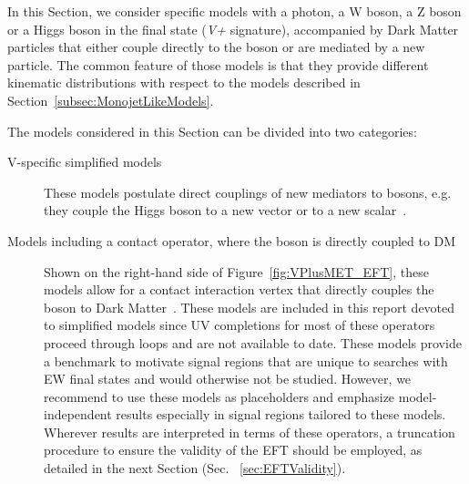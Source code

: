 
In this Section, we consider specific models with a photon, a W boson, a Z boson or a Higgs boson in the final state (\textit{V+\MET} signature), accompanied by Dark Matter particles that either couple directly to the boson or are mediated by a new particle. The common feature of those models is that they provide different kinematic distributions with respect to the models described in Section~\ref{subsec:MonojetLikeModels}.


The models considered in this Section can be divided into two categories:
\begin{description}
 \item[V-specific simplified models] These models postulate direct couplings of new mediators
 to bosons, e.g. they couple the Higgs boson to a new vector or to a new scalar~\cite{Carpenter:2013xra,Berlin:2014cfa}. 
 \item[Models including a contact operator, where the boson is directly coupled to DM]
 Shown on the right-hand side of Figure~\ref{fig:VPlusMET_EFT},
 these models allow for a contact interaction vertex that directly couples the boson to Dark Matter~\cite{Cotta:2012nj, Carpenter:2012rg, Crivellin:2015wva,Berlin:2014cfa}.
 These models are included in this report devoted to simplified models since 
 UV completions for most of these operators proceed through loops and are not available to date. 
 These models provide a benchmark to motivate signal regions that are unique to searches with
 EW final states and would otherwise not be studied. However, we recommend to use these models
 as placeholders and emphasize model-independent results especially in signal regions tailored to these models. 
 Wherever results are interpreted in terms of these operators, a truncation procedure
 to ensure the validity of the EFT should be employed, as detailed in the next Section (Sec. ~\ref{sec:EFTValidity}). 
\end{description}

